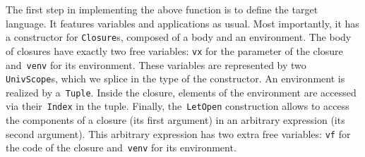 \documentclass[9pt,authoryear]{sigplanconf}
\begin{document}
%
The first step in implementing the above function is to define the
    target language. It features variables and applications as usual.
    Most importantly, it has a constructor for \texttt{Closure}s, composed
    of a body and an environment. The body of closures have exactly two
    free variables{:} \texttt{vx} for the parameter of the closure and{~}\texttt{venv}    for its environment.
    These variables are represented
    by two \texttt{UnivScope}s, which we splice in the type of the constructor.
    An environment is realized by a{~}\texttt{Tuple}.
    Inside the closure, elements of the environment are accessed via
    their{~}\texttt{Index} in the tuple. Finally, the{~}\texttt{LetOpen} construction
    allows to access the components of a closure (its first argument)
    in an arbitrary expression (its second argument). This arbitrary
    expression has two extra free variables{:} \texttt{vf} for the code of the
    closure and{~}\texttt{venv} for its environment.


{\nopagebreak }
\end{document}
